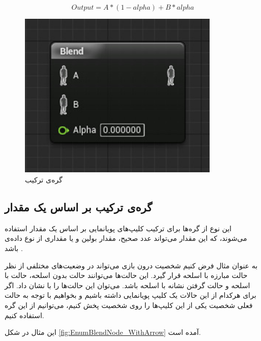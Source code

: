 \begin{equation}\label{eq:BlendNode}
	Output= A * (1-alpha) + B * alpha
\end{equation}



\begin{figure}[ht]
	\centerline{\includegraphics[width=\textwidth,height=8cm,keepaspectratio]{Figures/Ch3/BlendNode.png}}\hfill
	\caption{ گره‌ی ترکیب }
	\label{fig:BlendNode}
\end{figure}

\subsection{ گره‌ی ترکیب بر اساس یک مقدار}

این نوع از گره‌ها برای ترکیب کلیپ‌های پویانمایی بر اساس یک مقدار استفاده می‌شوند،
که این مقدار می‌تواند عدد صحیح، مقدار بولین و یا مقداری از 
نوع داده‌ی 
باشد \cite{BlendNodeUnrealEngine}.

به عنوان مثال فرض کنیم شخصیت درون بازی می‌تواند در وضعیت‌های مختلفی از نظر
حالت مبارزه با اسلحه قرار گیرد. این حالت‌ها می‌توانند حالت بدون اسلحه، 
حالت با اسلحه و حالت گرفتن نشانه با اسلحه باشد.
می‌توان این حالت‌ها را با
نشان داد.
اگر برای هرکدام از این حالات یک کلیپ پویانمایی داشته باشیم و بخواهیم 
با توجه به حالت فعلی شخصیت یکی از این کلیپ‌ها را روی شخصیت پخش کنیم،
می‌توانیم از این گره استفاده کنیم.

این مثال در شکل 
\ref{fig:EnumBlendNode_WithArrow}
آمده است.

